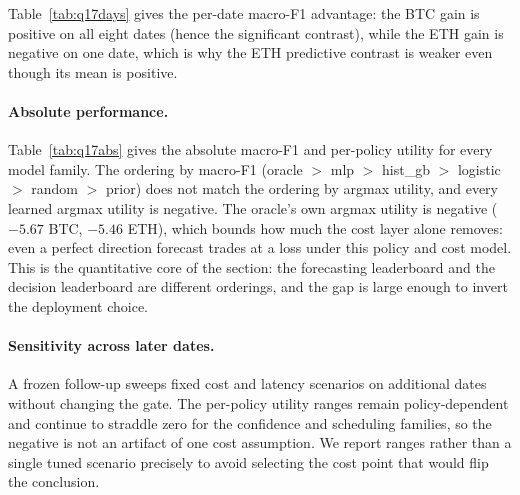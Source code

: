 





Table~\ref{tab:q17days} gives the per-date macro-F1 advantage: the BTC gain is positive on all
eight dates (hence the significant contrast), while the ETH gain is negative on one date, which
is why the ETH predictive contrast is weaker even though its mean is positive.

\paragraph{Absolute performance.} Table~\ref{tab:q17abs} gives the absolute macro-F1 and
per-policy utility for every model family. The ordering by macro-F1 (oracle $>$ mlp $>$
hist\_gb $>$ logistic $>$ random $>$ prior) does not match the ordering by argmax utility,
and every learned argmax utility is negative. The oracle's own argmax utility is negative
($-5.67$ BTC, $-5.46$ ETH), which bounds how much the cost layer alone removes: even a
perfect direction forecast trades at a loss under this policy and cost model. This is the
quantitative core of the section: the forecasting leaderboard and the decision leaderboard
are different orderings, and the gap is large enough to invert the deployment choice.

\paragraph{Sensitivity across later dates.} A frozen follow-up sweeps fixed cost and latency
scenarios on additional dates without changing the gate. The per-policy utility ranges
remain policy-dependent and continue to straddle zero for the confidence and scheduling
families, so the negative is not an artifact of one cost assumption. We report ranges rather
than a single tuned scenario precisely to avoid selecting the cost point that would flip the
conclusion.
